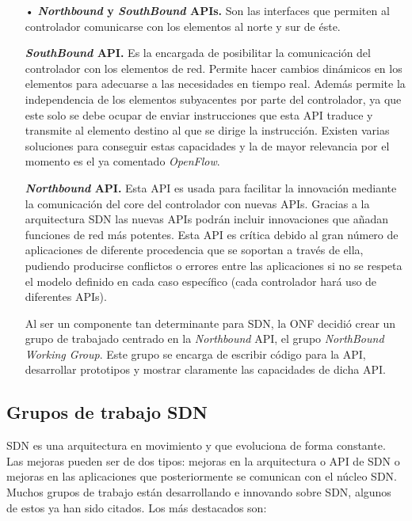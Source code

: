 \documentclass[a4paper,11pt]{book}
\begin{document}
\begin{itemize}
\item[•] \textbf{\textit{Northbound} y \textit{SouthBound} \ac{API}s.} Son las interfaces que permiten al controlador comunicarse con los elementos al norte y sur de éste.

\textbf{\textit{SouthBound} \ac{API}.} Es la encargada de posibilitar la comunicación del controlador con los elementos de red. Permite hacer cambios dinámicos en los elementos para adecuarse a las necesidades en tiempo real. Además permite la independencia de los elementos subyacentes por parte del controlador, ya que este solo se debe ocupar de enviar instrucciones que esta \ac{API} traduce y transmite al elemento destino al que se dirige la instrucción. Existen varias soluciones para conseguir estas capacidades y la de mayor relevancia por el momento es el ya comentado \emph{OpenFlow}.

\textbf{\textit{Northbound} \ac{API}.} Esta \ac{API} es usada para facilitar la innovación mediante la comunicación del core del controlador con nuevas \ac{API}s. Gracias a la arquitectura \ac{SDN} las nuevas \ac{API}s podrán incluir innovaciones que añadan funciones de red más potentes. Esta \ac{API} es crítica debido al gran número de aplicaciones de diferente procedencia que se soportan a través de ella, pudiendo producirse conflictos o errores entre las aplicaciones si no se respeta el modelo definido en cada caso específico (cada controlador hará uso de diferentes \ac{API}s).

Al ser un componente tan determinante para \ac{SDN}, la \ac{ONF} decidió crear un grupo de trabajado centrado en la \textit{Northbound} \ac{API}, el grupo \textit{NorthBound Working Group}. Este grupo se encarga de escribir código para la \ac{API}, desarrollar prototipos y mostrar claramente las capacidades de dicha \ac{API}.

\end{itemize}

\subsection{Grupos de trabajo \ac{SDN}}
\ac{SDN} es una arquitectura en movimiento y que evoluciona de forma constante. Las mejoras pueden ser de dos tipos: mejoras en la arquitectura o \ac{API} de \ac{SDN} o mejoras en las aplicaciones que posteriormente se comunican con el núcleo \ac{SDN}. Muchos grupos de trabajo están desarrollando e innovando sobre \ac{SDN}, algunos de estos ya han sido citados. Los más destacados son:
\end{document}
